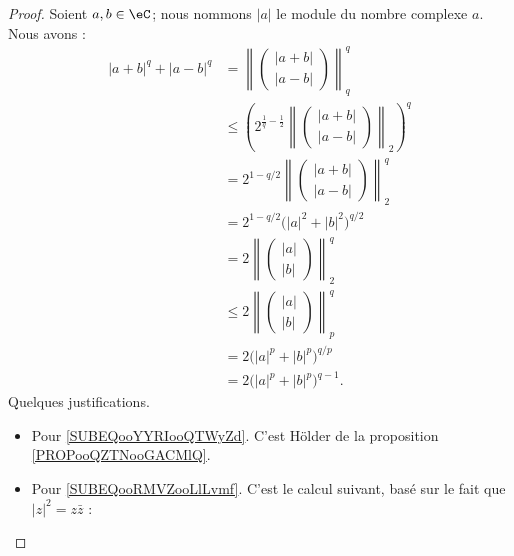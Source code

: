 \begin{proof}
    Soient \( a,b\in \eC\); nous nommons \( | a |\) le module du nombre complexe \( a\). Nous avons :
    \begin{subequations}
        \begin{align}
            | a+b |^q+| a-b |^q&=\left\|   \begin{pmatrix}
                | a+b |    \\ 
                | a-b |    
            \end{pmatrix}\right\|_q^q\\
            &\leq \left( 2^{\frac{1}{ q }-\frac{1}{ 2 }}\left\|  \begin{pmatrix}
                | a+b |    \\ 
                | a-b |    
            \end{pmatrix}\right\|_2 \right)^q    \label{SUBEQooYYRIooQTWyZd}   \\
            &=2^{1-q/2}\left\|   \begin{pmatrix}
                | a+b |    \\ 
                | a-b |    
            \end{pmatrix}\right\|_2^q\\
            &= 2^{1-q/2}\big( | a |^2+| b |^2 \big)^{q/2}       \label{SUBEQooRMVZooLlLvmf}\\
            &=2\left\| \begin{pmatrix}
                | a |    \\ 
                | b |    
            \end{pmatrix}\right\|_2^q\\
            &\leq 2\left\| \begin{pmatrix}
                | a |    \\ 
                | b |    
            \end{pmatrix}\right\|_p^q       \label{SUBEQooKZKSooEjwQpm}\\
            &=2\big( | a |^p+| b |^p \big)^{q/p}\\
            &=2\big( | a |^p+| b |^p \big)^{q-1}.       \label{SUBEQooUHJCooJKwGxe}
        \end{align}
    \end{subequations}
    Quelques justifications. 
    \begin{itemize}
        \item Pour \eqref{SUBEQooYYRIooQTWyZd}. C'est Hölder de la proposition \ref{PROPooQZTNooGACMlQ}.
        \item Pour \eqref{SUBEQooRMVZooLlLvmf}. C'est le calcul suivant, basé sur le fait que \( | z |^2=z\bar z\) :

\end{itemize}
\end{proof}
